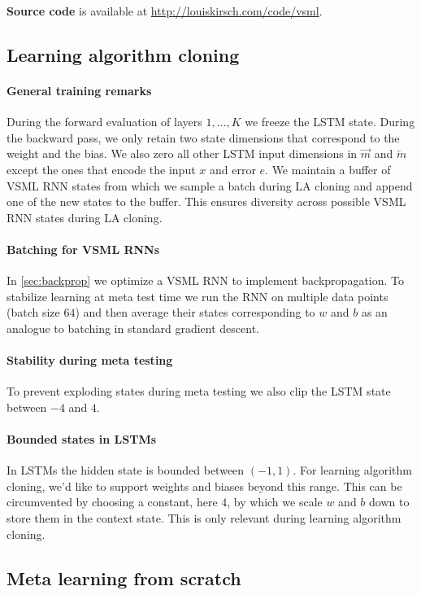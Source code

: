 \documentclass{article}
\newcommand{\sapproach}{VSML RNN}
\newcommand{\approach}{VSML RNNs}
\newcommand{\sfmsg}{\overrightarrow m}
\newcommand{\sbmsg}{\overleftarrow m}
\begin{document}
\textbf{Source code} is available at \url{http://louiskirsch.com/code/vsml}.

\subsection{Learning algorithm cloning}

\paragraph{General training remarks}
During the forward evaluation of layers $1, \ldots, K$ we freeze the LSTM state.
During the backward pass, we only retain two state dimensions that correspond to the weight and the bias.
We also zero all other LSTM input dimensions in $\sfmsg$ and $\sbmsg$ except the ones that encode the input $x$ and error $e$.
We maintain a buffer of {\sapproach} states from which we sample a batch during LA cloning and append one of the new states to the buffer.
This ensures diversity across possible {\sapproach} states during LA cloning.

\paragraph{Batching for {\approach}}
In \autoref{sec:backprop} we optimize a {\sapproach} to implement backpropagation.
To stabilize learning at meta test time we run the RNN on multiple data points (batch size $64$) and then average their states corresponding to $w$ and $b$ as an analogue to batching in standard gradient descent.

\paragraph{Stability during meta testing}
To prevent exploding states during meta testing we also clip the LSTM state between $-4$ and $4$.

\paragraph{Bounded states in LSTMs}
In LSTMs the hidden state is bounded between $(-1, 1)$.
For learning algorithm cloning, we'd like to support weights and biases beyond this range.
This can be circumvented by choosing a constant, here $4$, by which we scale $w$ and $b$ down to store them in the context state.
This is only relevant during learning algorithm cloning.

\subsection{Meta learning from scratch}
\end{document}
